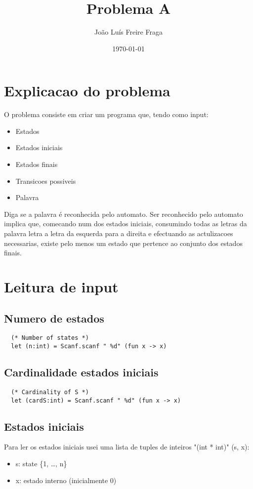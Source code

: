 \documentclass[11pt]{article}
\author{João Luís Freire Fraga}
\date{\today}
\title{Problema A}
\begin{document}
\maketitle
\tableofcontents

\pagebreak{}
\section{Explicacao do problema}
\label{sec:org5688866}

O problema consiste em criar um programa que, tendo como input:

\begin{itemize}
\item Estados
\item Estados iniciais
\item Estados finais
\item Transicoes possiveis
\item Palavra
\end{itemize}

Diga se a palavra é reconhecida pelo automato.
Ser reconhecido pelo automato implica que, comecando num dos estados iniciais, consumindo todas as letras da palavra letra a letra da esquerda para a direita e efectuando as actulizacoes necessarias, existe pelo menos um estado que pertence ao conjunto dos estados finais.

\pagebreak{}
\section{Leitura de input}
\label{sec:org5dbaf10}
\subsection{Numero de estados}
\label{sec:orgb2cdc66}
\begin{verbatim}
  (* Number of states *)
  let (n:int) = Scanf.scanf " %d" (fun x -> x)
\end{verbatim}
\subsection{Cardinalidade estados iniciais}
\label{sec:orga1053d1}
\begin{verbatim}
  (* Cardinality of S *)
  let (cardS:int) = Scanf.scanf " %d" (fun x -> x)
\end{verbatim}
\subsection{Estados iniciais}
\label{sec:org168fb5a}
Para ler os estados iniciais usei uma lista de tuples de inteiros "(int * int)" (s, x):
\begin{itemize}
\item s: state \{1, \ldots{}, n\}
\item x: estado interno (inicialmente 0)
\end{itemize}
\end{document}
